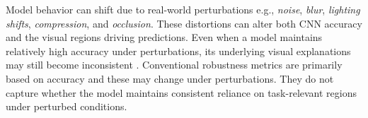 \documentclass[a4paper,fleqn]{cas-dc}
\begin{document}
	Model behavior can shift due to real-world perturbations e.g., \textit{noise}, \textit{blur}, \textit{lighting shifts}, \textit{compression}, and \textit{occlusion}. 
	These distortions can alter both CNN accuracy and the visual regions driving predictions. 
	Even when a model maintains relatively high accuracy under perturbations, its underlying visual explanations may still become inconsistent \cite{r5,ref6}. 
	Conventional robustness metrics are primarily based on accuracy and these may change under perturbations. 
	They do not capture whether the model maintains consistent reliance on task-relevant regions under perturbed conditions. 
	
\end{document}
